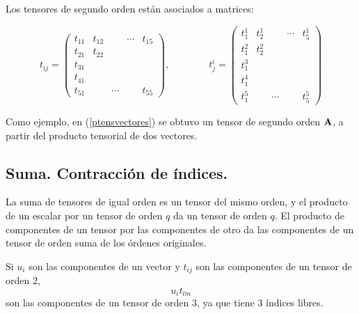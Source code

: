 \bigskip


Los tensores de segundo orden están asociados  a matrices:

\bigskip

$$t_{ij}=\left(\begin{array}{ccccc} t_{11} & t_{12}& & \cdots& t_{15}\\ t_{21}   &  t_{22}  &  &  & \\ t_{31}  &  &  &  &  \\ t_{41} &  &  &  &  \\ t_{51}  &  & \cdots &  & t_{55} 
\end{array}
 \right),  \qquad \qquad t^{i}_{j}=\left(\begin{array}{ccccc} t^{1}_{1} & t^{1}_{2}& & \cdots& t^{1}_{5}\\ t^{2}_{1}   &  t^{2}_{2}  &  &  & \\ t^{3}_{1}  &  &  &  &  \\ t^{4}_{1} &  &  &  &  \\ t^{5}_{1}  &  & \cdots &  & t^{5}_{5}
\end{array}
 \right) $$

 
\bigskip 
 

Como ejemplo, en  (\ref{ptensvectores}) se obtuvo un tensor de segundo orden $\bold{A}$, a partir del producto tensorial de dos vectores.  
 
 
 



\subsection{Suma. Contracción de índices.}
La suma de tensores de igual orden es un tensor del mismo orden, y el producto de un escalar por un tensor de orden $q$ da un tensor de orden $q$.
El producto de componentes de un tensor por las componentes de otro da las componentes de un tensor de orden suma de los órdenes originales.


\bigskip 

\begin{example}
    

Si $u_i$ son las componentes de un vector y $t_{ij}$ son las componentes de un tensor de orden $2$,
$$u_it_{lm}$$ 
son las componentes de un tensor de orden $3$, ya que tiene $3$ índices libres.
\end{example}





